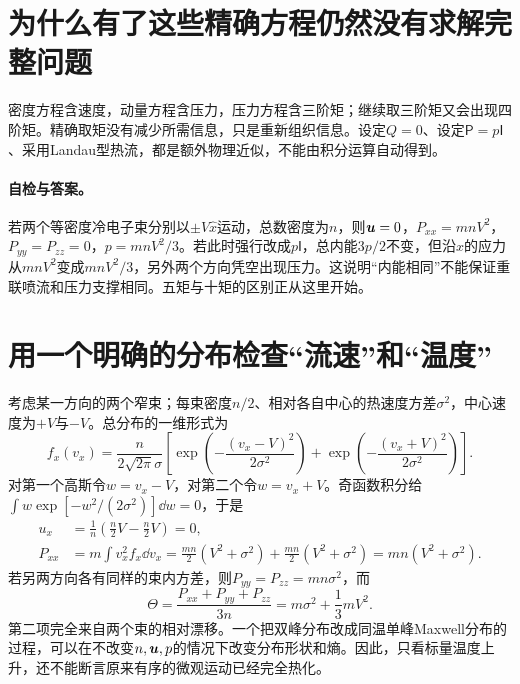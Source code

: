 \section{为什么有了这些精确方程仍然没有求解完整问题}
密度方程含速度，动量方程含压力，压力方程含三阶矩；继续取三阶矩又会出现四阶矩。精确取矩没有减少所需信息，只是重新组织信息。设定$Q=0$、设定$\mathsf P=p\mathsf I$、采用Landau型热流，都是额外物理近似，不能由积分运算自动得到。

\paragraph{自检与答案。}
若两个等密度冷电子束分别以$\pm V\hat x$运动，总数密度为$n$，则$\bm{u}=0$，$P_{xx}=mnV^2$，$P_{yy}=P_{zz}=0$，$p=mnV^2/3$。若此时强行改成$p\mathsf I$，总内能$3p/2$不变，但沿$x$的应力从$mnV^2$变成$mnV^2/3$，另外两个方向凭空出现压力。这说明“内能相同”不能保证重联喷流和压力支撑相同。五矩与十矩的区别正从这里开始。\citep{Wang2015,Ng2020}

\section{用一个明确的分布检查“流速”和“温度”}
考虑某一方向的两个窄束；每束密度$n/2$、相对各自中心的热速度方差$\sigma^2$，中心速度为$+V$与$-V$。总分布的一维形式为
\begin{equation}
f_x(v_x)=\frac{n}{2\sqrt{2\pi}\sigma}
\left[\exp\!\left(-\frac{(v_x-V)^2}{2\sigma^2}\right)
+\exp\!\left(-\frac{(v_x+V)^2}{2\sigma^2}\right)\right].
\end{equation}
对第一个高斯令$w=v_x-V$，对第二个令$w=v_x+V$。奇函数积分给$\int w\exp[-w^2/(2\sigma^2)]\dd w=0$，于是
\begin{align}
 u_x&=\frac1n\left(\frac n2V-\frac n2V\right)=0,\\
 P_{xx}&=m\int v_x^2f_x\dd v_x
 =\frac{mn}{2}(V^2+\sigma^2)+\frac{mn}{2}(V^2+\sigma^2)
 =mn(V^2+\sigma^2).
\end{align}
若另两方向各有同样的束内方差，则$P_{yy}=P_{zz}=mn\sigma^2$，而
\begin{equation}
\Theta=\frac{P_{xx}+P_{yy}+P_{zz}}{3n}
 =m\sigma^2+\frac13mV^2.
\end{equation}
第二项完全来自两个束的相对漂移。一个把双峰分布改成同温单峰Maxwell分布的过程，可以在不改变$n,\bm{u},p$的情况下改变分布形状和熵。因此，只看标量温度上升，还不能断言原来有序的微观运动已经完全热化。

